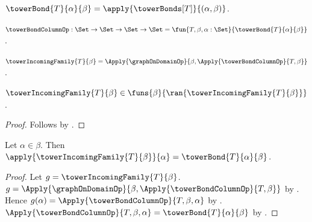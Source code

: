 \begin{definition}\label{tower_bond}
    $\towerBond{T}{\alpha}{\beta}=
        \apply{\towerBonds[T]}{(\alpha,\beta)}$.
\end{definition}

\begin{definition}\label{tower_bond_column_op}
    $\towerBondColumnOp:\Set\to\Set\to\Set\to\Set
        =\fun{T,\beta,\alpha:\Set}{
            \towerBond{T}{\alpha}{\beta}}$.
\end{definition}

\begin{definition}\label{tower_incoming_family}
    $\towerIncomingFamily{T}{\beta}=
        \Apply{\graphOnDomainOp}{\beta,
            \Apply{\towerBondColumnOp}{T,\beta}}$.
\end{definition}

\begin{proposition}\label{tower_incoming_family_type}
    $\towerIncomingFamily{T}{\beta}\in
        \funs{\beta}{\ran{\towerIncomingFamily{T}{\beta}}}$.
\end{proposition}
\begin{proof}
    Follows by
        .
\end{proof}

\begin{proposition}\label{tower_incoming_family_apply}
    Let $\alpha\in\beta$.
    Then $\apply{\towerIncomingFamily{T}{\beta}}{\alpha}=
        \towerBond{T}{\alpha}{\beta}$.
\end{proposition}
\begin{proof}
    Let $g=\towerIncomingFamily{T}{\beta}$.
    $g=\Apply{\graphOnDomainOp}{\beta,
        \Apply{\towerBondColumnOp}{T,\beta}}$ by
        .
    Hence $g(\alpha)=
        \Apply{\towerBondColumnOp}{T,\beta,\alpha}$ by
        .
    $\Apply{\towerBondColumnOp}{T,\beta,\alpha}=
        \towerBond{T}{\alpha}{\beta}$ by
        .
\end{proof}
